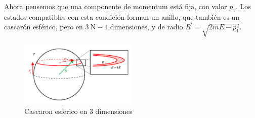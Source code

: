 Ahora pensemos que una componente de momentum está fija, con valor $p_1$. Los estados compatibles con esta condición forman un anillo, que también es un cascarón esférico, pero en $3 \mathrm{~N}-1$ dimensiones, y de radio $R^{\prime}=\sqrt{2 m E-p_1^2}$.
\begin{figure}[h]
    \centering
    \includegraphics[width=0.5\textwidth]{punto1/cascaron.png}
    \caption{Cascaron esferico en 3 dimensiones}
    \label{fig:f1}
\end{figure}

